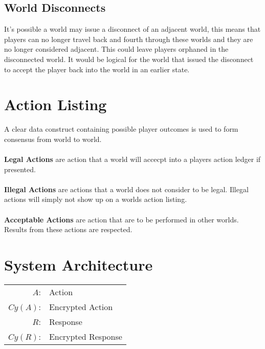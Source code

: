 \documentclass[runningheads,a4paper]{llncs}
\begin{document}
\subsection{World Disconnects}
\label{WD}
It's possible a world may issue a disconnect of an adjacent world, this means that players can no longer travel back and fourth through these worlds and they are no longer considered adjacent. This could leave players orphaned in the disconnected world. It would be logical for the world that issued the disconnect to accept the player back into the world in an earlier state.

\section{Action Listing}
A clear data construct containing possible player outcomes is used to form consensus from world to world.
\\\\
\textbf{Legal Actions} are action that a world will accecpt into a players action ledger if presented.
\\\\
\textbf{Illegal Actions} are actions that a world does not consider to be legal. Illegal actions will simply not show up on a worlds action listing.
\\\\
\textbf{Acceptable Actions} are action that are to be performed in other worlds. Results from these actions are respected.

\section{System Architecture}
\begin{center}
\begin{tabular}{r l}
$A$: & Action\\ 
$Cy(A)$: & Encrypted Action\\
$R$: & Response\\ 
$Cy(R)$: & Encrypted Response\\


\end{tabular}
\end{center}
\end{document}

